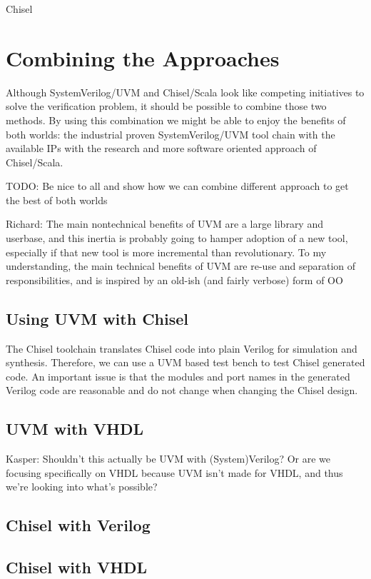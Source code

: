 \documentclass[a4paper, conference]{IEEEtran}
\newcommand{\todo}[1]{{\color{olive} TODO: #1}}
\newcommand{\ducky}[1]{{\color{orange} Richard: #1}}
\newcommand{\kasper}[1]{{\color{purple} Kasper: #1}}
\begin{document}
Chisel~\cite{chisel:dac2012} 

\section{Combining the Approaches}

Although SystemVerilog/UVM and Chisel/Scala look like competing initiatives
to solve the verification problem, it should be possible to combine those two methods.
By using this combination we might be able to enjoy the benefits of both worlds:
the industrial proven SystemVerilog/UVM tool chain with the available IPs with
the research and more software oriented approach of Chisel/Scala. 

\todo{Be nice to all and show how we can combine different approach to
get the best of both worlds}

\ducky{The main nontechnical benefits of UVM are a large library and userbase, and this inertia is probably going to hamper adoption of a new tool, especially if that new tool is more incremental than revolutionary. To my understanding, the main technical benefits of UVM are re-use and separation of responsibilities, and is inspired by an old-ish (and fairly verbose) form of OO}

\subsection{Using UVM with Chisel}

The Chisel toolchain translates Chisel code into plain Verilog for simulation and
synthesis. Therefore, we can use a UVM based test bench to test Chisel generated code.
An important issue is that the modules and port names in the generated Verilog
code are reasonable and do not change when changing the Chisel design.

\subsection{UVM with VHDL}
\kasper{Shouldn't this actually be UVM with (System)Verilog? Or are we focusing specifically on VHDL because UVM isn't made for VHDL, and thus we're looking into what's possible?}

\subsection{Chisel with Verilog}

\subsection{Chisel with VHDL}
\end{document}
